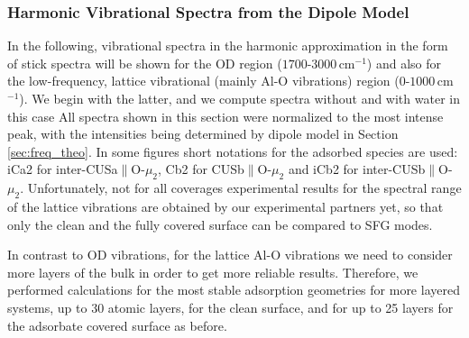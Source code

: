 \documentclass[11pt,DIV=13,BCOR=5mm,a4paper,headinclude]{scrbook}
\newcommand\todo[1]{\textcolor{red}{TODO: \textit{{#1}}}}
\begin{document}
\subsubsection{Harmonic Vibrational Spectra from the Dipole Model}\label{phonons}

In the following, vibrational spectra in the harmonic approximation in the form of stick spectra will be shown for the OD region ($1700$-$3000\,$cm$^{-1}$) and also for the low-frequency, lattice vibrational (mainly Al-O vibrations) region ($0$-$1000\,$cm$^{-1}$).
We begin with the latter, and we compute spectra without and with water in this case
All spectra shown in this section were normalized to the most intense peak, with the intensities being determined by dipole model in Section \ref{sec:freq_theo}.
In some figures short notations for the adsorbed species are used: iCa2 for inter-CUSa$\parallel$O-$\mu_2$, Cb2 for CUSb$\parallel$O-$\mu_2$ and iCb2 for inter-CUSb$\parallel$O-$\mu_2$.
Unfortunately, not for all coverages experimental results for the spectral range of the lattice vibrations are obtained by our experimental partners yet, so that only the clean and the fully covered surface can be compared to SFG modes.


In contrast to OD vibrations, for the lattice Al-O vibrations we need to consider more layers of the bulk in order to get more reliable results.
Therefore, we performed calculations for the most stable adsorption geometries for more layered systems, up to $30$ atomic layers, for the clean surface, and for up to 25 layers for the adsorbate covered surface as before.
\end{document}
